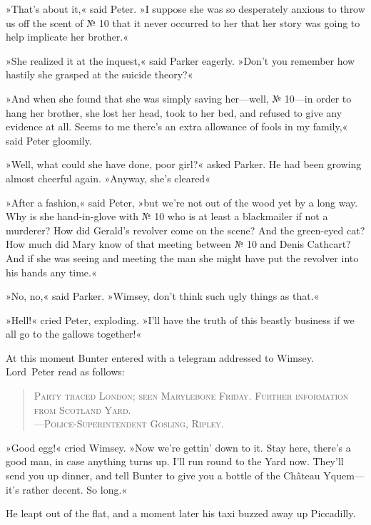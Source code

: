 »That's about it,« said Peter. »I suppose she was so desperately anxious to throw us off the scent of № 10 that it never occurred to her that her story was going to help implicate her brother.«

»She realized it at the inquest,« said Parker eagerly. »Don't you remember how hastily she grasped at the suicide theory?«

»And when she found that she was simply saving her—well, № 10—in order to hang her brother, she lost her head, took to her bed, and refused to give any evidence at all. Seems to me there's an extra allowance of fools in my family,« said Peter gloomily.

»Well, what could she have done, poor girl?« asked Parker. He had been growing almost cheerful again. »Anyway, she's cleared\longdash«

»After a fashion,« said Peter, »but we're not out of the wood yet by a long way. Why is she hand-in-glove with № 10 who is at least a blackmailer if not a murderer? How did Gerald's revolver come on the scene? And the green-eyed cat? How much did Mary know of that meeting between № 10 and Denis Cathcart? And if she was seeing and meeting the man she might have put the revolver into his hands any time.«

»No, no,« said Parker. »Wimsey, don't think such ugly things as that.«

»Hell!« cried Peter, exploding. »I'll have the truth of this beastly business if we all go to the gallows together!«

At this moment Bunter entered with a telegram addressed to Wimsey. Lord~Peter read as follows:

\begin{quote}

\textsc{Party traced London; seen Marylebone Friday. Further information from Scotland Yard.\\—Police-Superintendent Gosling, Ripley.}

\end{quote}

»Good egg!« cried Wimsey. »Now we're gettin' down to it. Stay here, there's a good man, in case anything turns up. I'll run round to the Yard now. They'll send you up dinner, and tell Bunter to give you a bottle of the Château Yquem—it's rather decent. So long.«

He leapt out of the flat, and a moment later his taxi buzzed away up Piccadilly.
